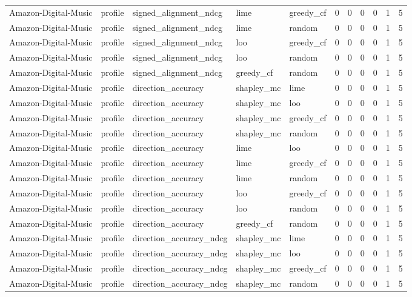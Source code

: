 \begin{table}[t]
{\begin{tabular}{lllllrrrrrr}
Amazon-Digital-Music & profile & signed\_alignment\_ndcg & lime & greedy\_cf & 0 & 0 & 0 & 0 & 1 & 5 \\
Amazon-Digital-Music & profile & signed\_alignment\_ndcg & lime & random & 0 & 0 & 0 & 0 & 1 & 5 \\
Amazon-Digital-Music & profile & signed\_alignment\_ndcg & loo & greedy\_cf & 0 & 0 & 0 & 0 & 1 & 5 \\
Amazon-Digital-Music & profile & signed\_alignment\_ndcg & loo & random & 0 & 0 & 0 & 0 & 1 & 5 \\
Amazon-Digital-Music & profile & signed\_alignment\_ndcg & greedy\_cf & random & 0 & 0 & 0 & 0 & 1 & 5 \\
Amazon-Digital-Music & profile & direction\_accuracy & shapley\_mc & lime & 0 & 0 & 0 & 0 & 1 & 5 \\
Amazon-Digital-Music & profile & direction\_accuracy & shapley\_mc & loo & 0 & 0 & 0 & 0 & 1 & 5 \\
Amazon-Digital-Music & profile & direction\_accuracy & shapley\_mc & greedy\_cf & 0 & 0 & 0 & 0 & 1 & 5 \\
Amazon-Digital-Music & profile & direction\_accuracy & shapley\_mc & random & 0 & 0 & 0 & 0 & 1 & 5 \\
Amazon-Digital-Music & profile & direction\_accuracy & lime & loo & 0 & 0 & 0 & 0 & 1 & 5 \\
Amazon-Digital-Music & profile & direction\_accuracy & lime & greedy\_cf & 0 & 0 & 0 & 0 & 1 & 5 \\
Amazon-Digital-Music & profile & direction\_accuracy & lime & random & 0 & 0 & 0 & 0 & 1 & 5 \\
Amazon-Digital-Music & profile & direction\_accuracy & loo & greedy\_cf & 0 & 0 & 0 & 0 & 1 & 5 \\
Amazon-Digital-Music & profile & direction\_accuracy & loo & random & 0 & 0 & 0 & 0 & 1 & 5 \\
Amazon-Digital-Music & profile & direction\_accuracy & greedy\_cf & random & 0 & 0 & 0 & 0 & 1 & 5 \\
Amazon-Digital-Music & profile & direction\_accuracy\_ndcg & shapley\_mc & lime & 0 & 0 & 0 & 0 & 1 & 5 \\
Amazon-Digital-Music & profile & direction\_accuracy\_ndcg & shapley\_mc & loo & 0 & 0 & 0 & 0 & 1 & 5 \\
Amazon-Digital-Music & profile & direction\_accuracy\_ndcg & shapley\_mc & greedy\_cf & 0 & 0 & 0 & 0 & 1 & 5 \\
Amazon-Digital-Music & profile & direction\_accuracy\_ndcg & shapley\_mc & random & 0 & 0 & 0 & 0 & 1 & 5 \\

\end{tabular}}
\end{table}

